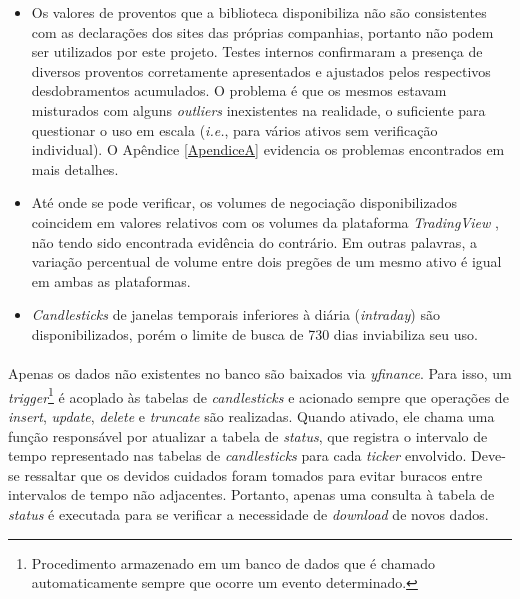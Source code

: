 \begin{itemize}
    \item Os valores de proventos que a biblioteca disponibiliza não são consistentes com as declarações dos sites das próprias companhias, portanto não podem ser utilizados por este projeto. Testes internos confirmaram a presença de diversos proventos corretamente apresentados e ajustados pelos respectivos desdobramentos acumulados. O problema é que os mesmos estavam misturados com alguns \textit{outliers} inexistentes na realidade, o suficiente para questionar o uso em escala (\textit{i.e.}, para vários ativos sem verificação individual). O Apêndice \ref{ApendiceA} evidencia os problemas encontrados em mais detalhes.

    \item Até onde se pode verificar, os volumes de negociação disponibilizados coincidem em valores relativos com os volumes da plataforma \textit{TradingView} \cite{tradingview}, não tendo sido encontrada evidência do contrário. Em outras palavras, a variação percentual de volume entre dois pregões de um mesmo ativo é igual em ambas as plataformas.

    \item \textit{Candlesticks} de janelas temporais inferiores à diária (\textit{intraday}) são disponibilizados, porém o limite de busca de 730 dias inviabiliza seu uso.
\end{itemize}


\paragraph{} Apenas os dados não existentes no banco são baixados via \textit{yfinance}. Para isso, um \textit{trigger}\footnote{Procedimento armazenado em um banco de dados que é chamado automaticamente sempre que ocorre um evento determinado.} é acoplado às tabelas de \textit{candlesticks} e acionado sempre que operações de \textit{insert}, \textit{update}, \textit{delete} e \textit{truncate} são realizadas. Quando ativado, ele chama uma função responsável por atualizar a tabela de \textit{status}, que registra o intervalo de tempo representado nas tabelas de \textit{candlesticks} para cada \textit{ticker} envolvido. Deve-se ressaltar que os devidos cuidados foram tomados para evitar buracos entre intervalos de tempo não adjacentes. Portanto, apenas uma consulta à tabela de \textit{status} é executada para se verificar a necessidade de \textit{download} de novos dados.



